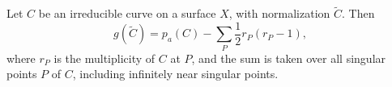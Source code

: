 Let $C$ be an irreducible curve on a surface $X$, with normalization $\tilde{C}$. Then
$$g(\tilde{C}) = p_a(C) - \sum_P \frac{1}{2} r_P(r_P - 1),$$
where $r_P$ is the multiplicity of $C$ at $P$, and the sum is taken over all singular points $P$ of $C$, including infinitely near singular points.
